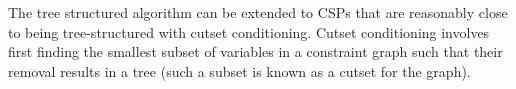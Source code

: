 The tree structured algorithm can be extended to CSPs that are reasonably close to being tree-structured
with cutset conditioning. Cutset conditioning involves first finding the smallest subset of variables in a constraint graph such that their removal results in a tree (such a subset is known as a cutset for the graph).
